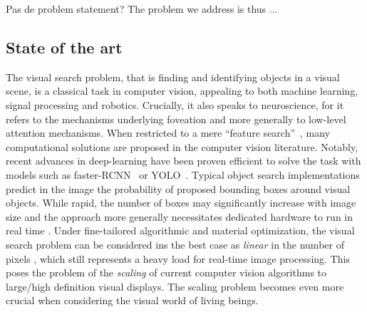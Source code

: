 {\color{green} Pas de problem statement?}
The problem we address is thus ...

%
\subsection{State of the art}

The visual search problem, that is finding and identifying objects in a visual scene, is a classical task in computer vision, appealing to both
machine learning, signal processing and robotics. Crucially, it also speaks to neuroscience, for it refers to the mechanisms underlying foveation and more generally to low-level attention mechanisms.
When restricted to a mere ``feature search''~\cite{Treisman80}, many computational solutions are proposed in the computer vision literature. Notably, recent advances in deep-learning have been proven efficient to solve the task with models such as faster-RCNN~\cite{Ren17} or YOLO~\cite{Redmon16}. %
Typical object search implementations predict in the image the probability of proposed bounding boxes around visual objects. While rapid, the number of boxes may significantly increase with image size and the approach more generally necessitates dedicated hardware to run in real time \cite{feng2019computer}. Under fine-tailored algorithmic and material optimization, the visual search problem can be considered ins the best case as \emph{linear} in the number of pixels \cite{strengert2006pyramid}, which still represents a heavy load for real-time image processing. This poses the problem of the \emph{scaling} of current computer vision algorithms to large/high definition visual displays. The scaling problem becomes even more crucial when considering the visual world of living beings.

